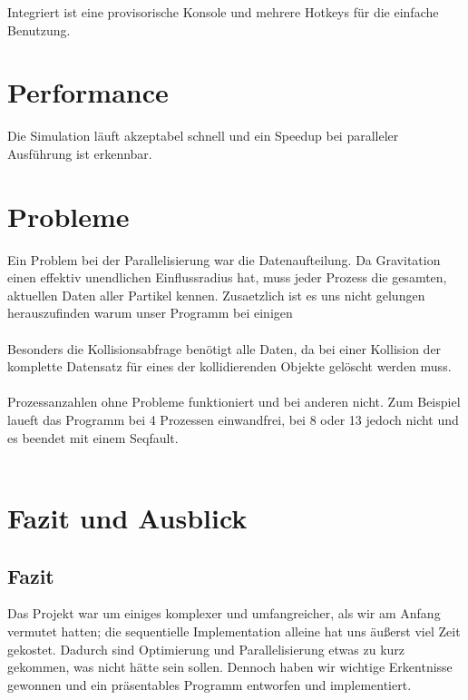 Integriert ist eine provisorische Konsole und mehrere Hotkeys für die einfache Benutzung.

\section{Performance}
Die Simulation läuft akzeptabel schnell und ein Speedup bei paralleler
Ausführung ist erkennbar.

\section{Probleme}
Ein Problem bei der Parallelisierung war die Datenaufteilung. Da Gravitation einen effektiv
unendlichen Einflussradius hat, muss jeder Prozess die gesamten, aktuellen Daten aller
Partikel kennen.
Zusaetzlich ist es uns nicht gelungen herauszufinden warum unser Programm bei einigen \\ \\

Besonders die Kollisionsabfrage benötigt alle Daten, da bei einer Kollision der komplette
Datensatz für eines der kollidierenden Objekte gelöscht werden muss. \\ \\

Prozessanzahlen ohne Probleme funktioniert und bei anderen nicht. Zum Beispiel laueft das
Programm bei 4 Prozessen einwandfrei, bei 8 oder 13 jedoch nicht und es beendet mit einem
Seqfault. \\ \\

\section{Fazit und Ausblick}
\subsection{Fazit}
Das Projekt war um einiges komplexer und umfangreicher, als wir am Anfang vermutet hatten;
die sequentielle Implementation alleine hat uns äußerst viel Zeit gekostet.
Dadurch sind Optimierung und Parallelisierung etwas zu kurz gekommen, was nicht hätte sein
sollen. Dennoch haben wir wichtige Erkentnisse gewonnen und ein präsentables Programm
entworfen und implementiert.
